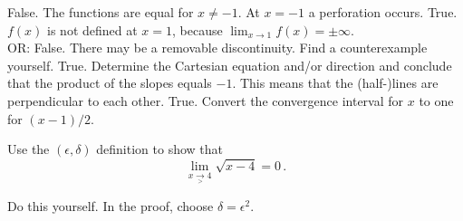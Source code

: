 \begin{Answer}

\Question False. The functions are equal for $x \neq -1$. At $x=-1$ a perforation occurs.
\Question True. $f(x)$ is not defined at $x=1$, because $\displaystyle \lim_{x \to 1} f(x) = \pm \infty$. \\
OR: False. There may be a removable discontinuity. Find a counterexample yourself.
\Question True. Determine the Cartesian equation and/or direction and conclude that the product of the slopes equals $-1$. This means that the (half-)lines are perpendicular to each other. 
\Question True. Convert the convergence interval for $x$ to one for $(x-1)/2$.

\end{Answer}



\begin{Exercise} %
Use the $(\epsilon,\delta)$ definition to show that
$$
\lim_{x\underset{>}{\rightarrow}4}\sqrt{x-4}=0\,.
$$
\end{Exercise}

\begin{Answer}\phantom{}
Do this yourself. In the proof, choose $\delta = \epsilon^2$.
\end{Answer}


